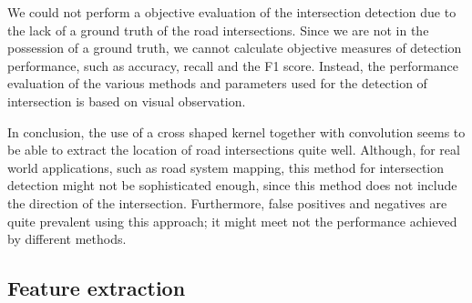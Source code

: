 
We could not perform a objective evaluation of the intersection detection due to the lack of a ground truth of the road intersections. Since we are not in the possession of a ground truth, we cannot calculate objective measures of detection performance, such as accuracy, recall and the F1 score. Instead, the performance evaluation of the various methods and parameters used for the detection of intersection is based on visual observation.

In conclusion, the use of a cross shaped kernel together with convolution seems to be able to extract the location of road intersections quite well. Although, for real world applications, such as road system mapping, this method for intersection detection might not be sophisticated enough, since this method does not include the direction of the intersection. Furthermore, false positives and negatives are quite prevalent using this approach; it might meet not the performance achieved by different methods.

\subsection{Feature extraction}

